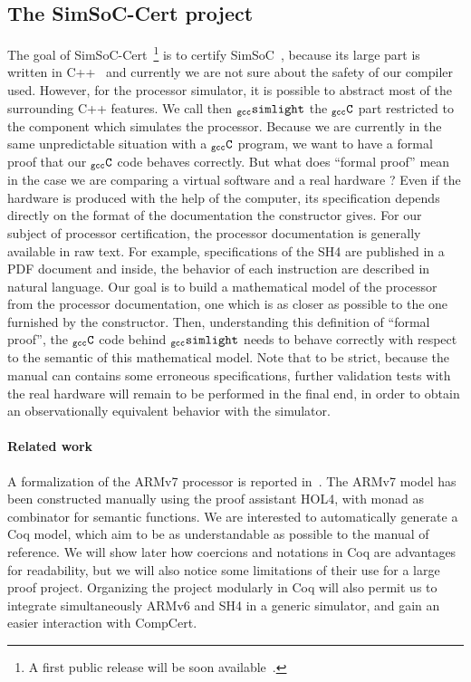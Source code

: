 \documentclass[a4paper, 11pt]{article}
\newcommand{\newrelease}{A first public release will be soon available}
\newcommand{\gccSL}{$_{\tt gcc}{\tt simlight}$\xspace}
\newcommand{\gccC}{$_{\tt gcc}{\tt C}$\xspace}
\newcommand{\simsoc}{SimSoC\xspace}
\newcommand{\SScert}{SimSoC-Cert\xspace}
\begin{document}
\subsection{The \SScert project}
The goal of \SScert~\footnote{\newrelease~\cite{urlsscert}.} is to certify \simsoc~\cite{arm}, because its large part is written in C++~\cite{ossc09} and currently we are not sure about the safety of our compiler used. However, for the processor simulator, it is possible to abstract most of the surrounding C++ features. We call then \gccSL the \gccC part restricted to the component which simulates the processor. Because we are currently in the same unpredictable situation with a \gccC program, we want to have a formal proof that our \gccC code behaves correctly. But what does ``formal proof'' mean in the case we are comparing a virtual software and a real hardware ? Even if the hardware is produced with the help of the computer, its specification depends directly on the format of the documentation the constructor gives. For our subject of processor certification, the processor documentation is generally available in raw text. For example, specifications of the SH4 are published in a PDF document and inside, the behavior of each instruction are described in natural language. Our goal is to build a mathematical model of the processor from the processor documentation, one which is as closer as possible to the one furnished by the constructor. Then, understanding this definition of ``formal proof'', the \gccC code behind \gccSL needs to behave correctly with respect to the semantic of this mathematical model. Note that to be strict, because the manual can contains some erroneous specifications, further validation tests with the real hardware will remain to be performed in the final end, in order to obtain an observationally equivalent behavior with the simulator.

\paragraph{Related work}
A formalization of the ARMv7 processor is reported in~\cite{conf/itp/FoxM10}. The ARMv7 model has been constructed manually using the proof assistant HOL4, with monad as combinator for semantic functions. 
We are interested to automatically generate a Coq model, which aim to be as understandable as possible to the manual of reference. We will show later how coercions and notations in Coq are advantages for readability, but we will also notice some limitations of their use for a large proof project. Organizing the project modularly in Coq will also permit us to integrate simultaneously ARMv6 and SH4 in a generic simulator, and gain an easier interaction with CompCert.
\end{document}
